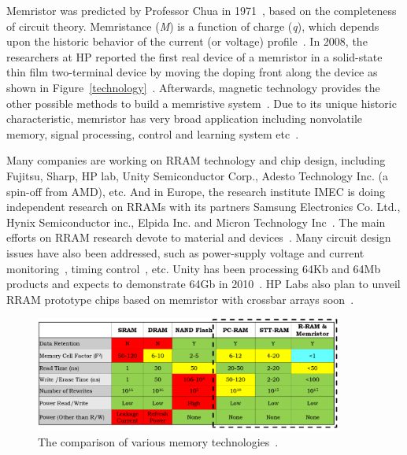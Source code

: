 Memristor was predicted by Professor Chua in 1971~\cite{Chua71}, based on the completeness of circuit theory. Memristance (\textit{M}) is a function of charge (\textit{q}), which depends upon the historic behavior of the current (or voltage) profile~\cite{Chua76,Strukov08}. In 2008, the researchers at HP reported the first real device of a memristor in a solid-state thin film two-terminal device by moving the doping front along the device as shown in Figure~\ref{technology}~\cite{Tour08}. Afterwards, magnetic technology provides the other possible methods to build a memristive system~\cite{Pershin08,Wang09}. Due to its unique historic characteristic, memristor has very broad application including nonvolatile memory, signal processing, control and learning system etc~\cite{Chen09}.

Many companies are working on RRAM technology and chip design, including Fujitsu, Sharp, HP lab, Unity Semiconductor Corp., Adesto Technology Inc. (a spin-off from AMD), etc. And in Europe, the research institute IMEC is doing independent research on RRAMs with its partners Samsung Electronics Co. Ltd., Hynix Semiconductor inc., Elpida Inc. and Micron Technology Inc~\cite{Johnson10}. The main efforts on RRAM research devote to material and devices~\cite{Fujimoto06,Jung07,Janousch07,Liu00,Hsu07}. Many circuit design issues have also been addressed, such as power-supply voltage and current monitoring~\cite{Balasubramanian09}, timing control~\cite{Kwak09}, etc. Unity has been processing 64Kb and 64Mb products and expects to demonstrate 64Gb in 2010~\cite{LaPedus09}. HP Labs also plan to unveil RRAM prototype chips based on memristor with crossbar arrays soon~\cite{Johnson08}.


\begin{figure}
\centering
\vspace{-10pt}
\includegraphics[width=0.9\textwidth]{./figure/2_table.pdf}
\vspace{-10pt}
\caption{The comparison of various memory technologies~\cite{ITRS07}.}
\label{table}
\vspace{-10pt}
\end{figure}

